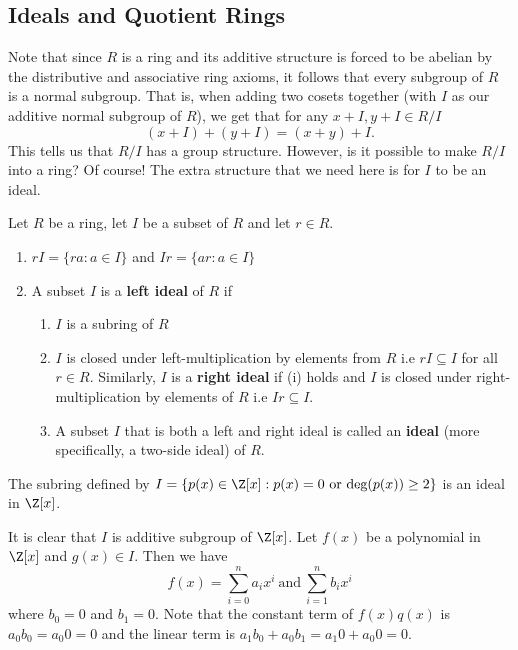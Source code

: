 \subsection{Ideals and Quotient Rings}

Note that since \( R  \) is a ring and its additive structure is forced to be abelian by the distributive and associative ring axioms, it follows that every subgroup of \( R  \) is a normal subgroup. That is, when adding two cosets together (with \( I  \) as our additive normal subgroup of \( R  \)), we get that for any \(  x + I, y + I \in   R / I  \)
\[  (x+ I) + (y + I ) = (x + y) + I.  \]
This tells us that \( R / I  \) has a group structure. However, is it possible to make \( R / I  \) into a ring? Of course! The extra structure that we need here is for \( I  \) to be an ideal.

\begin{definition}[Ideals]
    Let \( R  \) be a ring, let \( I  \) be a subset of \( R  \) and let \( r \in R  \). 
    \begin{enumerate}
        \item[(1)] \( rI = \{ ra : a \in I \}  \) and \( Ir = \{ a r : a \in I  \}  \)
        \item[(2)] A subset \( I  \) is a \textbf{left ideal} of \( R  \) if 
            \begin{enumerate}
                \item[(i)] \( I \) is a subring of \( R  \)
                \item[(ii)] \( I \) is closed under left-multiplication by elements from \( R  \) i.e \( rI \subseteq I   \) for all \( r \in R  \).
                    Similarly, \( I \) is a \textbf{right ideal} if (i) holds and \( I  \) is closed under right-multiplication by elements of \( R  \) i.e \( Ir \subseteq I  \).
                    
        \item[(3)] A subset \( I \) that is both a left and right ideal is called an \textbf{ideal} (more specifically, a two-side ideal) of \( R  \). 
            \end{enumerate}
    \end{enumerate}
\end{definition}

\begin{eg}
    The subring defined by \( I = \{  p(x) \in \Z [x] : p(x) = 0 \ \text{or} \ \text{deg}(p(x)) \geq 2 \}  \) is an ideal in \( \Z[x] \).

    It is clear that \( I  \) is additive subgroup of \( \Z[x] \). Let \( f(x)  \) be a polynomial in \( \Z[x] \) and \( g(x) \in I \). Then we have 
    \[  f(x) = \sum_{ i = 0  }^{ n } {a}_{i} x^{i}  \ \text{and} \ \sum_{ i=1  }^{ n  } {b}_{i} x^{i} \]
    where \( {b}_{0} = 0 \) and \( {b}_{1} = 0  \). Note that the constant term of \( f(x) q(x)  \) is \( {a}_{0}{b}_{0} = {a}_{0} 0 = 0  \) and the linear term is \( {a}_{1} {b}_{0} + {a}_{0} {b}_{1} = {a}_{1} 0 + {a}_{0} 0 = 0  \).
\end{eg}

